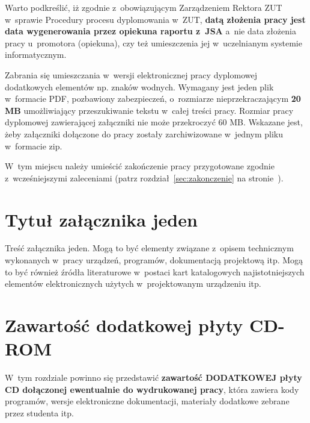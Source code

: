 \documentclass[skorowidz,skroty]{dyplomWEZUT}
\begin{document}
Warto podkreślić, iż zgodnie z~obowiązującym Zarządzeniem Rektora ZUT w~sprawie Procedury procesu dyplomowania w~ZUT, \textbf{datą złożenia pracy jest data wygenerowania przez opiekuna raportu z~JSA} a~nie data złożenia pracy u~promotora (opiekuna), czy też umieszczenia jej w~uczelnianym systemie informatycznym.

Zabrania się umieszczania w~wersji elektronicznej pracy dyplomowej dodatkowych elementów np. znaków wodnych. Wymagany jest jeden plik w~formacie PDF, pozbawiony zabezpieczeń, o~rozmiarze nieprzekraczającym \textbf{20 MB} umożliwiający przeszukiwanie tekstu w~całej treści pracy. Rozmiar pracy dyplomowej zawierającej załączniki nie może przekroczyć 60 MB. Wskazane jest, żeby załączniki dołączone do pracy zostały zarchiwizowane w~jednym pliku w~formacie zip.



\begin{zakonczenie}\label{chap:zakonczenie}
W~tym miejscu należy umieścić zakończenie pracy przygotowane zgodnie z~wcześniejszymi zaleceniami (patrz rozdział~\ref{sec:zakonczenie} na stronie~\pageref{sec:zakonczenie}).
\end{zakonczenie}


\appendix

\chapter{Tytuł załącznika jeden}\label{chap:dodatek1}

Treść załącznika jeden. Mogą to być elementy związane z~opisem technicznym wykonanych w~pracy urządzeń, programów, dokumentacją projektową itp. Mogą to być również źródła literaturowe w~postaci kart katalogowych najistotniejszych elementów elektronicznych użytych w~projektowanym urządzeniu itp.

\chapter{Zawartość dodatkowej płyty CD-ROM}\label{chap:dodatkowyCD}

W~tym rozdziale powinno się przedstawić \textbf{zawartość DODATKOWEJ płyty CD dołączonej ewentualnie do wydrukowanej pracy}, która zawiera kody programów, wersje elektroniczne dokumentacji, materiały dodatkowe zebrane przez studenta itp.
\end{document}
